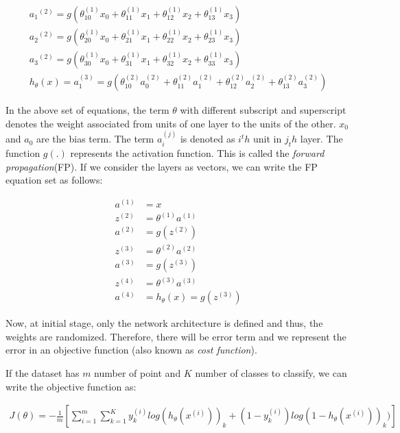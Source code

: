 \begin{align}
    {a_1}^{(2)} = g(\theta _{10}^{(1)}x_{0} + \theta _{11}^{(1)}x_{1} + \theta _{12}^{(1)}x_{2} +\theta _{13}^{(1)}x_{3}) \\
    {a_2}^{(2)} = g(\theta _{20}^{(1)}x_{0} + \theta _{21}^{(1)}x_{1} + \theta _{22}^{(1)}x_{2} +\theta _{23}^{(1)}x_{3}) \\
    {a_3}^{(2)} = g(\theta _{30}^{(1)}x_{0} + \theta _{31}^{(1)}x_{1} + \theta _{32}^{(1)}x_{2} +\theta _{33}^{(1)}x_{3}) \\
    h_{\theta}(x) = a_{1}^{(3)} = g(\theta _{10}^{(2)}a_{0}^{(2)} +\theta _{11}^{(2)}a_{1}^{(2)} + \theta _{12}^{(2)}a_{2}^{(2)} +\theta _{13}^{(2)}a_{3}^{(2)})
\end{align}


In the above set of equations, the term $\theta$ with different subscript and superscript denotes the weight associated from units of one layer to the units of the other. $x_0$ and $a_0$ are the bias term. The term $a_i^{(j)}$ is denoted as $i^th$ unit in $j_th$ layer. The function $g(.)$ represents the activation function. This is called the \textit{forward propagation}(FP). If we consider the layers as vectors, we can write the FP equation set as follows:

\begin{align}
    a^{(1)} &= x \\
    z^{(2)} &= \theta^{(1)}a^{(1)} \\
    a^{(2)} &= g(z^{(2)}) \\
    z^{(3)} &= \theta^{(2)}a^{(2)}\\
    a^{(3)} &= g(z^{(3)})\\
    z^{(4)} &= \theta^{(3)}a^{(3)}\\
    a^{(4)} &= h_{\theta}(x)=g(z^{(3)})
\end{align}



Now, at initial stage, only the network architecture is defined and thus, the weights are randomized. Therefore, there will be error term and we represent the error in an objective function (also known as \textit{cost function}). 

If the dataset has $m$ number of point and $K$ number of classes to classify, we can write the objective function as:

\begin{align}
    J(\theta) = - \frac{1}{m}[\sum_{i=1}^{m}\sum_{k=1}^{K}y_{k}^{(i)}log(h_{\theta}(x^{(i)}))_{k}+ (1-y_{k}^{(i)})log(1-h_{\theta}(x^{(i)}))_{k})]
    \label{eq:cost}
\end{align}


